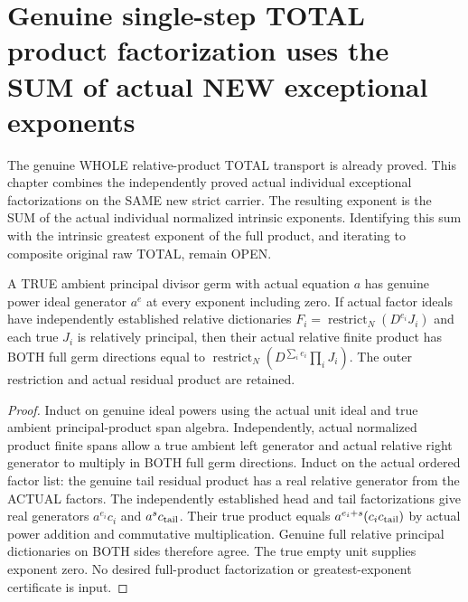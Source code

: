 \section{Genuine single-step TOTAL product factorization uses the SUM of actual NEW exceptional exponents}

The genuine WHOLE relative-product TOTAL transport is already proved. This
chapter combines the independently proved actual individual exceptional
factorizations on the SAME new strict carrier. The resulting exponent is
the SUM of the actual individual normalized intrinsic exponents. Identifying
this sum with the intrinsic greatest exponent of the full product, and
iterating to composite original raw TOTAL, remain OPEN.

\begin{lemma}
\label{hir:sharp-actual-relative-product-exceptional-power-sum-algebra}
\leanok
A TRUE ambient principal divisor germ with actual equation $a$ has genuine
power ideal generator $a^e$ at every exponent including zero. If actual
factor ideals have independently established relative dictionaries
$F_i=\operatorname{restrict}_N(D^{e_i}J_i)$ and each true $J_i$ is relatively
principal, then their actual relative finite product has BOTH full germ
directions equal to $\operatorname{restrict}_N(D^{\sum_i e_i}\prod_i J_i)$.
The outer restriction and actual residual product are retained.
\end{lemma}
\begin{proof}
Induct on genuine ideal powers using the actual unit ideal and true
ambient principal-product span algebra. Independently, actual normalized
product finite spans allow a true ambient left generator and actual
relative right generator to multiply in BOTH full germ directions. Induct
on the actual ordered factor list: the genuine tail residual product has
a real relative generator from the ACTUAL factors. The independently
established head and tail factorizations give real generators
$a^{e_i}c_i$ and $a^{s}c_{\rm tail}$. Their true product equals
$a^{e_i+s}(c_i c_{\rm tail})$ by actual power addition and commutative
multiplication. Genuine full relative principal dictionaries on BOTH sides
therefore agree. The true empty unit supplies exponent zero. No desired
full-product factorization or greatest-exponent certificate is input.
\end{proof}

